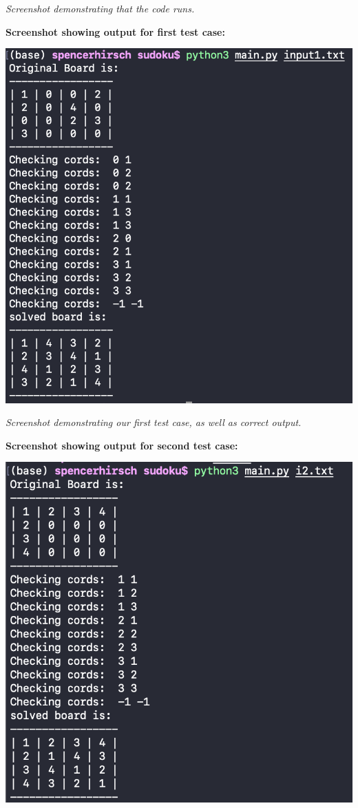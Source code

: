 \documentclass{article}
\begin{document}
\textit{Screenshot demonstrating that the code runs.}

\pagebreak

\textbf{Screenshot showing output for first test case:}

\bigskip

\includegraphics{test1.png}

\textit{Screenshot demonstrating our first test case, as well as correct output.}

\pagebreak

\textbf{Screenshot showing output for second test case:}

\bigskip

\includegraphics{test2.png}
\end{document}
